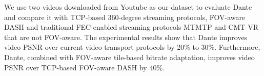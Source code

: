 We use two videos downloaded from Youtube as our dataset to 
evaluate Dante and compare it with TCP-based 360-degree streaming 
protocols, FOV-aware DASH \cite{Omnidirectional_Video_over_HTTP} and traditional FEC-enabled streaming protocols MTMTP \cite{MPMTP} and CMT-VR \cite{CMT-VR} 
that are not FOV-aware. The experimental results show that Dante 
improves video PSNR over current video transport protocols by
20\% to 30\%. Furthermore, Dante, combined with FOV-aware tile-based bitrate adaptation, improves video PSNR over TCP-based FOV-aware DASH by 40\%.



